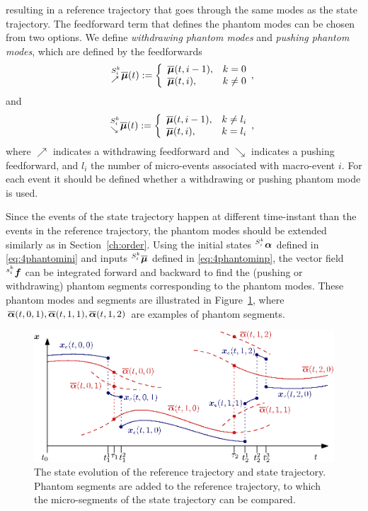 \documentclass[../DC2017114Bouma.tex]{subfiles}
\begin{document}
resulting in a reference trajectory that goes through the same modes as the state trajectory. The feedforward term that defines the phantom modes can be chosen from two options. We define \textit{withdrawing phantom modes} and \textit{pushing phantom modes}, which are defined by the feedforwards
\begin{equation}
\hspace{0cm}^{S^k_i}_{\nearrow}\overline{\boldsymbol{\mu}}(t) := \left\lbrace\begin{array}{ll}
\overline{\boldsymbol{\mu}}(t,i-1), & k = 0\\
\overline{\boldsymbol{\mu}}(t,i), & k \neq 0
\end{array},\right.
\end{equation}
and
\begin{equation}
\hspace{0cm}^{S^k_i}_{\searrow}\overline{\boldsymbol{\mu}}(t) := \left\lbrace\begin{array}{ll}
\overline{\boldsymbol{\mu}}(t,i-1), & k \neq l_i\\
\overline{\boldsymbol{\mu}}(t,i), & k = l_i
\end{array},\right.\label{eq:4phantominp}
\end{equation}
%
where $\nearrow$ indicates a withdrawing feedforward and $\searrow$ indicates a pushing feedforward, and $l_i$ the number of micro-events associated with macro-event $i$. For each event it should be defined whether a withdrawing or pushing phantom mode is used. 

Since the events of the state trajectory happen at different time-instant than the events in the reference trajectory, the phantom modes should be extended similarly as in Section~\ref{ch:order}. 
Using the initial states $\hspace{0cm}^{S_i^{k}}\boldsymbol{\alpha}$ defined in \eqref{eq:4phantomini} and inputs $\hspace{0cm}^{S^k_i}\overline{\boldsymbol{\mu}}$ defined in \eqref{eq:4phantominp}, the vector field $\hspace{0cm}^{s^k_i}{\boldsymbol{f}}$ can be integrated forward and backward to find the (pushing or withdrawing) phantom segments corresponding to the phantom modes. These phantom modes and segments are illustrated in Figure~\ref{fig:4simulmicro}, where $\overline{\boldsymbol{\alpha}}(t,0,1),\overline{\boldsymbol{\alpha}}(t,1,1),\overline{\boldsymbol{\alpha}}(t,1,2)$ are examples of phantom segments.
\begin{figure}[h]
\centering
\includegraphics[width=.9\textwidth]{simulmicro.eps}\caption{The state evolution of the reference trajectory and state trajectory. Phantom segments are added to the reference trajectory, to which the micro-segments of the state trajectory can be compared.}\label{fig:4simulmicro}
\end{figure}
\end{document}
